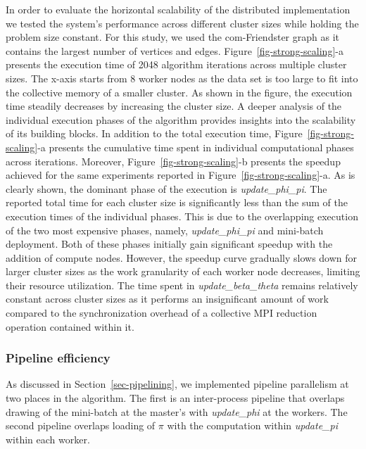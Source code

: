 In order to evaluate the horizontal scalability of the distributed
implementation we tested the system's performance across different cluster
sizes while holding the problem size constant. For this study, we used the
com-Friendster graph as it contains the largest number of vertices and edges.
%
Figure~\ref{fig-strong-scaling}-a presents the execution time of 2048 algorithm
iterations across multiple cluster sizes. The x-axis starts from 8 worker nodes
as the data set is too large to fit into the collective memory of a smaller
cluster.
%
As shown in the figure, the execution
time steadily decreases by increasing the cluster size.
A deeper analysis of the individual execution phases of the algorithm provides
insights into the scalability of its building blocks.
%
In addition to the total execution time, Figure~\ref{fig-strong-scaling}-a
presents the cumulative time spent in individual computational phases across
iterations. Moreover, Figure~\ref{fig-strong-scaling}-b presents the speedup
achieved for the same experiments reported in
Figure~\ref{fig-strong-scaling}-a. As is clearly shown, the dominant phase of
the execution is \textit{update\_phi\_pi}.
The reported total time for each cluster size is significantly less than the
sum of the execution times of the individual phases. This is due to the
overlapping execution of the two most expensive phases, namely,
\textit{update\_phi\_pi} and
mini-batch deployment. Both of these phases initially gain significant speedup with the
addition of compute nodes. However, the speedup curve gradually slows down for
larger cluster sizes as the work granularity of each worker node decreases,
limiting their resource utilization.
%
The time spent in \textit{update\_beta\_theta} remains relatively constant across cluster sizes
as it performs an insignificant amount of work compared to the synchronization
overhead of a collective MPI reduction operation contained within it.

\subsubsection{Pipeline efficiency}
\label{eval-pipeline}

As discussed in Section~\ref{sec-pipelining}, we implemented pipeline
parallelism at
two places in the algorithm. The first is an inter-process pipeline that
overlaps drawing of the mini-batch at the master's with \textit{update\_phi}
at the workers. The second pipeline overlaps loading of $\pi$ with the
computation within \textit{update\_pi} within each worker.

